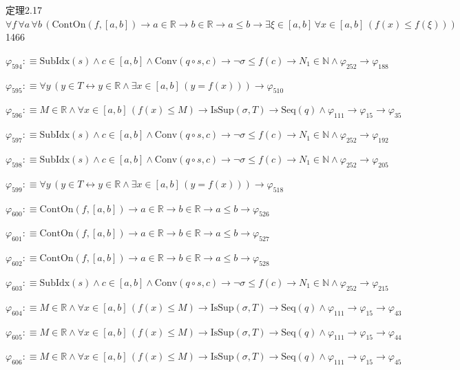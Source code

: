 \begin{fullproof}{定理2.17}{$\forall f\,\forall a\,\forall b\,(\mathrm{ContOn}(f,[a,b]) \to a \in \mathbb{R} \to b \in \mathbb{R} \to a \leq b \to \exists \xi \in [a,b]\,\forall x \in [a,b]\,(f(x) \leq f(\xi)))$}{1466}
\begin{abbrevlist}
\item $\varphi_{594} :\equiv \mathrm{SubIdx}(s) \land c \in [a,b] \land \mathrm{Conv}(q \circ s,c) \to \neg \sigma \leq f(c) \to N_{1} \in \mathbb{N} \land \varphi_{252} \to \varphi_{188}$
\item $\varphi_{595} :\equiv \forall y\,(y \in T \leftrightarrow y \in \mathbb{R} \land \exists x \in [a,b]\,(y = f(x))) \to \varphi_{510}$
\item $\varphi_{596} :\equiv M \in \mathbb{R} \land \forall x \in [a,b]\,(f(x) \leq M) \to \mathrm{IsSup}(\sigma,T) \to \mathrm{Seq}(q) \land \varphi_{111} \to \varphi_{15} \to \varphi_{35}$
\item $\varphi_{597} :\equiv \mathrm{SubIdx}(s) \land c \in [a,b] \land \mathrm{Conv}(q \circ s,c) \to \neg \sigma \leq f(c) \to N_{1} \in \mathbb{N} \land \varphi_{252} \to \varphi_{192}$
\item $\varphi_{598} :\equiv \mathrm{SubIdx}(s) \land c \in [a,b] \land \mathrm{Conv}(q \circ s,c) \to \neg \sigma \leq f(c) \to N_{1} \in \mathbb{N} \land \varphi_{252} \to \varphi_{205}$
\item $\varphi_{599} :\equiv \forall y\,(y \in T \leftrightarrow y \in \mathbb{R} \land \exists x \in [a,b]\,(y = f(x))) \to \varphi_{518}$
\item $\varphi_{600} :\equiv \mathrm{ContOn}(f,[a,b]) \to a \in \mathbb{R} \to b \in \mathbb{R} \to a \leq b \to \varphi_{526}$
\item $\varphi_{601} :\equiv \mathrm{ContOn}(f,[a,b]) \to a \in \mathbb{R} \to b \in \mathbb{R} \to a \leq b \to \varphi_{527}$
\item $\varphi_{602} :\equiv \mathrm{ContOn}(f,[a,b]) \to a \in \mathbb{R} \to b \in \mathbb{R} \to a \leq b \to \varphi_{528}$
\item $\varphi_{603} :\equiv \mathrm{SubIdx}(s) \land c \in [a,b] \land \mathrm{Conv}(q \circ s,c) \to \neg \sigma \leq f(c) \to N_{1} \in \mathbb{N} \land \varphi_{252} \to \varphi_{215}$
\item $\varphi_{604} :\equiv M \in \mathbb{R} \land \forall x \in [a,b]\,(f(x) \leq M) \to \mathrm{IsSup}(\sigma,T) \to \mathrm{Seq}(q) \land \varphi_{111} \to \varphi_{15} \to \varphi_{43}$
\item $\varphi_{605} :\equiv M \in \mathbb{R} \land \forall x \in [a,b]\,(f(x) \leq M) \to \mathrm{IsSup}(\sigma,T) \to \mathrm{Seq}(q) \land \varphi_{111} \to \varphi_{15} \to \varphi_{44}$
\item $\varphi_{606} :\equiv M \in \mathbb{R} \land \forall x \in [a,b]\,(f(x) \leq M) \to \mathrm{IsSup}(\sigma,T) \to \mathrm{Seq}(q) \land \varphi_{111} \to \varphi_{15} \to \varphi_{45}$

\end{abbrevlist}
\end{fullproof}
